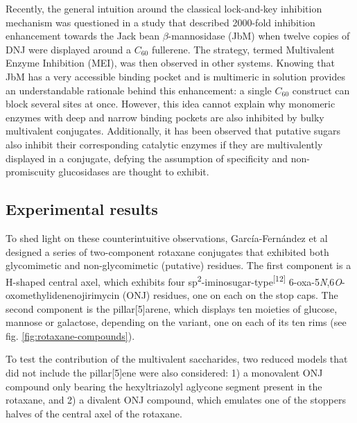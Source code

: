 Recently, the general intuition around the classical lock-and-key inhibition mechanism was questioned in a study that described 2000-fold inhibition enhancement towards the Jack bean $\beta$-mannosidase (JbM) when twelve copies of DNJ were displayed around a $C_{60}$ fullerene.\cite{compain2010glycosidase} The strategy, termed Multivalent Enzyme Inhibition (MEI), was then observed in other systems. Knowing that JbM has a very accessible binding pocket and is multimeric in solution provides an understandable rationale behind this enhancement: a single $C_{60}$  construct can block several sites at once. However, this idea cannot explain why monomeric enzymes with deep and narrow binding pockets are also inhibited by bulky multivalent conjugates. Additionally, it has been observed that putative sugars also inhibit their corresponding catalytic enzymes if they are multivalently displayed in a conjugate, defying the assumption of specificity and non-promiscuity glucosidases are thought to exhibit.

\subsection{Experimental results}

To shed light on these counterintuitive observations, García-Fernández et al  designed a series of two-component rotaxane conjugates that exhibited both glycomimetic and non-glycomimetic (putative) residues. The first component is a H-shaped central axel, which exhibits four sp\textsuperscript{2}-iminosugar-type\textsuperscript{[12]} 6-oxa-5\textit{N},6\textit{O}-oxomethylidenenojirimycin (ONJ) residues, one on each on the stop caps. The second component is the pillar[5]arene, which displays ten moieties of glucose, mannose or galactose, depending on the variant, one on each of its ten rims (see fig. \ref{fig:rotaxane-compounds}).

To test the contribution of the multivalent saccharides, two reduced models that did not include the pillar[5]ene were also considered: 1) a monovalent ONJ compound only bearing the hexyltriazolyl aglycone segment present in the rotaxane, and 2) a divalent ONJ compound, which emulates one of the stoppers halves of the central axel of the rotaxane.



